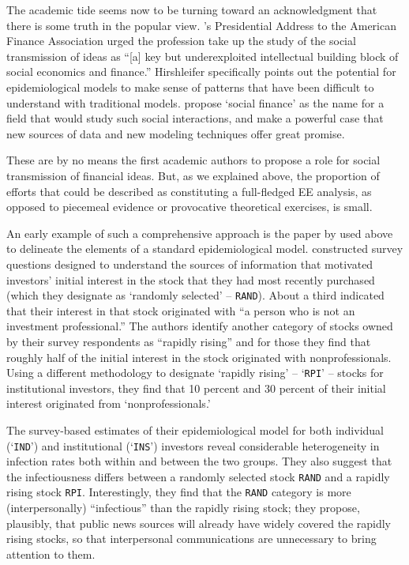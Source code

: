 The academic tide seems now to be turning toward an acknowledgment that there is some truth in the popular view. \cite{hirshleifer2020presidential}'s Presidential Address to the American Finance Association urged the profession take up the study of the social transmission of ideas as ``[a] key but underexploited intellectual building block of social economics and finance.''   Hirshleifer specifically points out the potential for epidemiological models to make sense of patterns that have been difficult to understand with traditional models.  \cite{kuchler2021social} propose `social finance' as the name for a field that would study such social interactions, and make a powerful case that new sources of data and new modeling techniques offer great promise.

These are by no means the first academic authors to propose a role for social transmission of financial ideas.  But, as we explained above, the proportion of efforts that could be described as constituting a full-fledged EE analysis, as opposed to piecemeal evidence or provocative theoretical exercises, is small. %

An early example of such a comprehensive approach is the paper by \cite{shiller1989survey} used above to delineate the elements of a standard epidemiological model.  \cite{shiller1989survey} constructed survey questions designed to understand the sources of information that motivated investors' initial interest in the stock that they had most recently purchased (which they designate as `randomly selected' -- \texttt{RAND}).  About a third indicated that their interest in that stock originated with ``a person who is not an investment professional.''  The authors identify another category of stocks owned by their survey respondents as ``rapidly rising'' and for those they find that roughly half of the initial interest in the stock originated with nonprofessionals.  Using a different methodology to designate `rapidly rising' -- `\texttt{RPI}' -- stocks for institutional investors, they find that 10 percent and 30 percent of their initial interest originated from `nonprofessionals.'

The survey-based estimates of their epidemiological model for both individual (`\texttt{IND}') and institutional (`\texttt{INS}') investors reveal considerable heterogeneity in infection rates both within and between the two groups. They also suggest that the infectiousness differs between a randomly selected stock \texttt{RAND} and a rapidly rising stock \texttt{RPI}. Interestingly, they find that the \texttt{RAND} category is more (interpersonally) ``infectious'' than the rapidly rising stock; they propose, plausibly, that public news sources will already have widely covered the rapidly rising stocks, so that interpersonal communications are unnecessary to bring attention to them.

